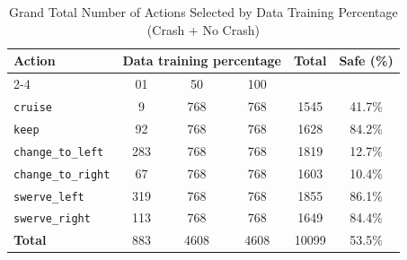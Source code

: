 \documentclass{article}
\begin{document}
\begin{table}[h]
\centering
\caption{Grand Total Number of Actions Selected by Data Training Percentage (Crash + No Crash)}
\begin{tabular}{l|ccc|c|c}
\toprule
\multirow{2}{*}{Action} & \multicolumn{3}{c|}{Data training percentage} & \multirow{2}{*}{Total} & \multirow{2}{*}{Safe (\%)} \\
\cmidrule{2-4}
 & 01 & 50 & 100 & & \\
\midrule
\texttt{cruise} & 9 & 768 & 768 & 1545 & 41.7\% \\ 
\texttt{keep} & 92 & 768 & 768 & 1628 & 84.2\% \\ 
\texttt{change\_to\_left} & 283 & 768 & 768 & 1819 & 12.7\% \\ 
\texttt{change\_to\_right} & 67 & 768 & 768 & 1603 & 10.4\% \\ 
\texttt{swerve\_left} & 319 & 768 & 768 & 1855 & 86.1\% \\ 
\texttt{swerve\_right} & 113 & 768 & 768 & 1649 & 84.4\% \\ 
\midrule
\textbf{Total} & 883 & 4608 & 4608 & 10099 & 53.5\% \\ 
\bottomrule
\end{tabular}
\end{table}
\end{document}
